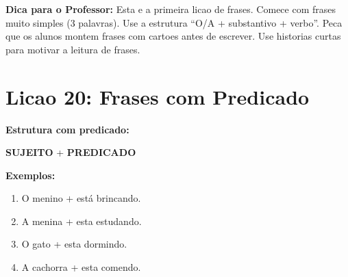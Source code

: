 \begin{dica}
\textbf{Dica para o Professor:} Esta e a primeira licao de frases. Comece com frases muito simples (3 palavras). Use a estrutura ``O/A + substantivo + verbo''. Peca que os alunos montem frases com cartoes antes de escrever. Use historias curtas para motivar a leitura de frases.
\end{dica}

\section{Licao 20: Frases com Predicado}

\rotinasimples
{}



\textbf{Estrutura com predicado:}
\begin{center}
\textbf{SUJEITO} + \textbf{PREDICADO}
\end{center}

\textbf{Exemplos:}
\begin{enumerate}[leftmargin=2cm]
  \item O menino + \textcolor{accent}{est\'a brincando.}
  \item A menina + \textcolor{accent}{esta estudando.}
  \item O gato + \textcolor{accent}{esta dormindo.}
  \item A cachorra + \textcolor{accent}{esta comendo.}
\end{enumerate}

